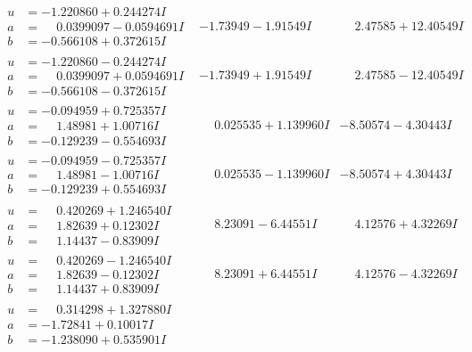 \documentclass[1p]{elsarticle_modified}
\theoremstyle{definition}
\begin{document}
$$\begin{array}{c|c|c}
\begin{aligned}
u &= -1.220860 + 0.244274 I \\
a &= \phantom{-}0.0399097 - 0.0594691 I \\
b &= -0.566108 + 0.372615 I\end{aligned}
 & -1.73949 - 1.91549 I & \phantom{-}2.47585 + 12.40549 I \\ \hline\begin{aligned}
u &= -1.220860 - 0.244274 I \\
a &= \phantom{-}0.0399097 + 0.0594691 I \\
b &= -0.566108 - 0.372615 I\end{aligned}
 & -1.73949 + 1.91549 I & \phantom{-}2.47585 - 12.40549 I \\ \hline\begin{aligned}
u &= -0.094959 + 0.725357 I \\
a &= \phantom{-}1.48981 + 1.00716 I \\
b &= -0.129239 - 0.554693 I\end{aligned}
 & \phantom{-}0.025535 + 1.139960 I & -8.50574 - 4.30443 I \\ \hline\begin{aligned}
u &= -0.094959 - 0.725357 I \\
a &= \phantom{-}1.48981 - 1.00716 I \\
b &= -0.129239 + 0.554693 I\end{aligned}
 & \phantom{-}0.025535 - 1.139960 I & -8.50574 + 4.30443 I \\ \hline\begin{aligned}
u &= \phantom{-}0.420269 + 1.246540 I \\
a &= \phantom{-}1.82639 + 0.12302 I \\
b &= \phantom{-}1.14437 - 0.83909 I\end{aligned}
 & \phantom{-}8.23091 - 6.44551 I & \phantom{-}4.12576 + 4.32269 I \\ \hline\begin{aligned}
u &= \phantom{-}0.420269 - 1.246540 I \\
a &= \phantom{-}1.82639 - 0.12302 I \\
b &= \phantom{-}1.14437 + 0.83909 I\end{aligned}
 & \phantom{-}8.23091 + 6.44551 I & \phantom{-}4.12576 - 4.32269 I \\ \hline\begin{aligned}
u &= \phantom{-}0.314298 + 1.327880 I \\
a &= -1.72841 + 0.10017 I \\
b &= -1.238090 + 0.535901 I\end{aligned}

\end{array}$$
\end{document}
